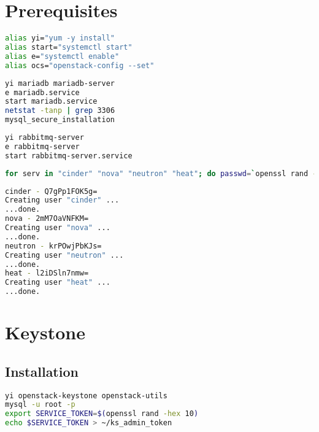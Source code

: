 \documentclass[11pt,letterpaper,oneside]{book}
\begin{document}
\chapter{Prerequisites}

\begin{lstlisting}[caption={Bash Aliases},language=bash]
alias yi="yum -y install"
alias start="systemctl start"
alias e="systemctl enable"
alias ocs="openstack-config --set"
\end{lstlisting}

\begin{lstlisting}[caption={Database Install},language=bash]
yi mariadb mariadb-server
e mariadb.service 
start mariadb.service 
netstat -tanp | grep 3306
mysql_secure_installation 
\end{lstlisting}

\begin{lstlisting}[caption={RabbitMQ Install},language=bash]
yi rabbitmq-server
e rabbitmq-server
start rabbitmq-server.service
\end{lstlisting}

\begin{lstlisting}[caption={Create RabbitMQ User Accounts},language=bash]
for serv in "cinder" "nova" "neutron" "heat"; do passwd=`openssl rand -base64 8`; echo "$serv - $passwd"; rabbitmqctl add_user $serv $passwd; rabbitmqctl set_permissions -p / $serv ".*" ".*" ".*"; done
\end{lstlisting}


\begin{lstlisting}[caption={Result from user account creation},language=bash]
cinder - Q7gPp1FOK5g=
Creating user "cinder" ...
...done.
nova - 2mM7OaVNFKM=
Creating user "nova" ...
...done.
neutron - krPOwjPbKJs=
Creating user "neutron" ...
...done.
heat - l2iDSln7nmw=
Creating user "heat" ...
...done.
\end{lstlisting}

\chapter{Keystone}

\section{Installation}
\begin{lstlisting}[caption={Install Keystone packages},language=bash]
yi openstack-keystone openstack-utils 
mysql -u root -p
export SERVICE_TOKEN=$(openssl rand -hex 10)
echo $SERVICE_TOKEN > ~/ks_admin_token
\end{lstlisting}
\end{document}
